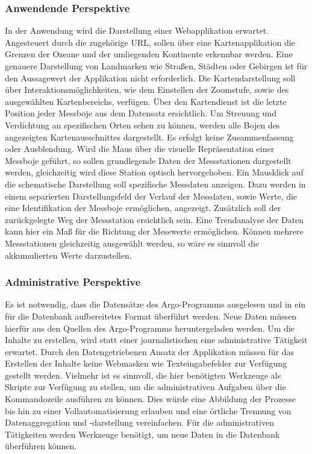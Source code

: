     \subsubsection{Anwendende Perspektive}\label{sec:funkAnforderungenAnwender}

    In der Anwendung wird die Darstellung einer Webapplikation erwartet. Angesteuert durch die zugehörige URL,
    sollen über eine Kartenapplikation die Grenzen der Ozeane und der umliegenden Kontinente erkennbar werden.  Eine genauere Darstellung von Landmarken wie Straßen, Städten oder Gebirgen ist für den Aussagewert der Applikation nicht erforderlich. Die Kartendarstellung soll über Interaktionsmöglichkeiten, wie dem Einstellen der Zoomstufe, sowie des ausgewählten Kartenbereichs, verfügen. Über den Kartendienst ist die letzte Position jeder Messboje aus dem Datensatz ersichtlich. Um Streuung und Verdichtung an spezifischen Orten sehen zu können, werden alle Bojen des angezeigten Kartenausschnittes dargestellt. Es erfolgt keine Zusammenfassung oder Ausblendung.
    Wird die Maus über die visuelle Repräsentation einer Messboje geführt, so sollen grundlegende Daten der Messstationen dargestellt werden, gleichzeitig wird diese Station optisch hervorgehoben.
    Ein Mausklick auf die schematische Darstellung soll spezifische Messdaten anzeigen. Dazu werden in einem separierten Darstellungsfeld der Verlauf der Messdaten, sowie Werte, die eine Identifikation der Messboje ermöglichen, angezeigt. Zusätzlich soll der zurückgelegte Weg der Messstation ersichtlich sein.  Eine Trendanalyse der Daten kann hier ein Maß für die Richtung der Messwerte ermöglichen. Können mehrere Messstationen gleichzeitig ausgewählt werden, so wäre es sinnvoll die akkumulierten Werte darzustellen.

    \subsubsection{Administrative Perspektive} \label{sec:funkAnforderungenAdmin}

    Es ist notwendig, dass die Datensätze des Argo-Programms ausgelesen und in ein für die Datenbank aufbereitetes Format überführt werden. Neue Daten müssen hierfür aus den Quellen des Argo-Programms heruntergeladen werden. Um die Inhalte zu erstellen, wird statt einer journalistischen eine administrative Tätigkeit erwartet. Durch den Datengetriebenen Ansatz der Applikation müssen für das Erstellen der Inhalte keine Webmasken wie Texteingabefelder zur Verfügung gestellt werden. Vielmehr ist es sinnvoll, die hier benötigten Werkzeuge als Skripte zur Verfügung zu stellen, um die administrativen Aufgaben über die Kommandozeile ausführen zu können. Dies würde eine Abbildung der Prozesse bis hin zu einer Vollautomatisierung erlauben und eine örtliche Trennung von Datenaggregation und -darstellung vereinfachen.
    Für die administrativen Tätigkeiten werden Werkzeuge benötigt, um neue Daten  in die Datenbank überführen können.


